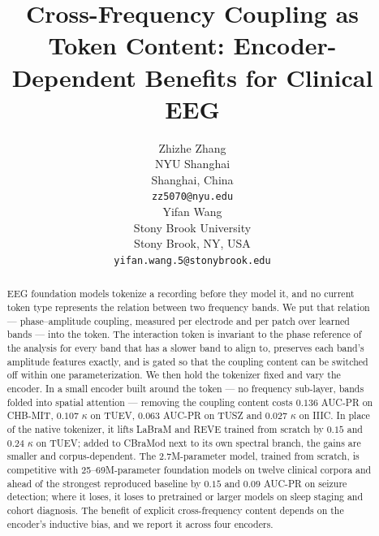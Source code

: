 \documentclass{article} %
\title{Cross-Frequency Coupling as Token Content: Encoder-Dependent Benefits for Clinical EEG}
\author{%
Zhizhe Zhang \\
NYU Shanghai \\
Shanghai, China \\
\texttt{zz5070@nyu.edu} \\
\And
Yifan Wang \\
Stony Brook University \\
Stony Brook, NY, USA \\
\texttt{yifan.wang.5@stonybrook.edu}
}
\begin{document}
\maketitle

\begin{abstract}
EEG foundation models tokenize a recording before they model it, and no
current token type represents the relation between two frequency bands.
We put that relation --- phase--amplitude coupling, measured per electrode
and per patch over learned bands --- into the token. The interaction token
is invariant to the phase reference of the analysis for every band that
has a slower band to align to, preserves each band's amplitude features
exactly, and is gated so that the coupling content can be switched off
within one parameterization. We then hold the tokenizer fixed and vary
the encoder. In a small encoder built around the token --- no frequency
sub-layer, bands folded into spatial attention --- removing the coupling
content costs $0.136$ AUC-PR on CHB-MIT, $0.107$ $\kappa$ on TUEV, $0.063$
AUC-PR on TUSZ and $0.027$ $\kappa$ on IIIC. In place of the native
tokenizer, it lifts LaBraM and REVE trained from scratch by $0.15$ and
$0.24$ $\kappa$ on TUEV; added to CBraMod next to its own spectral branch,
the gains are smaller and corpus-dependent. The 2.7M-parameter model,
trained from scratch, is competitive with 25--69M-parameter foundation
models on twelve clinical corpora and ahead of the strongest reproduced
baseline by $0.15$ and $0.09$ AUC-PR on seizure detection; where it loses,
it loses to pretrained or larger models on sleep staging and cohort
diagnosis. The benefit of explicit cross-frequency content depends on the
encoder's inductive bias, and we report it across four encoders.
\end{abstract}













\appendix

\end{document}
